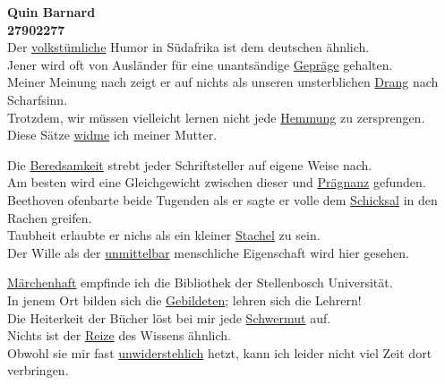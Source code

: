 \documentclass[12pt,a4paper]{article}
\begin{document}
\textbf{Quin Barnard}\\
\textbf{27902277}\\

Der \underline{volkstümliche} Humor in Südafrika ist dem deutschen ähnlich.\\
Jener wird oft von Ausländer für eine unantsändige \underline{Gepräge} gehalten.\\
Meiner Meinung nach zeigt er auf nichts als unseren unsterblichen \underline{Drang} nach Scharfsinn.\\
Trotzdem, wir müssen vielleicht lernen nicht jede \underline{Hemmung} zu zersprengen.\\
Diese Sätze \underline{widme} ich meiner Mutter.\par

Die \underline{Beredsamkeit} strebt jeder Schriftsteller auf eigene Weise nach.\\
Am besten wird eine Gleichgewicht zwischen dieser und \underline{Prägnanz} gefunden.\\
Beethoven ofenbarte beide Tugenden als er sagte er volle dem \underline{Schicksal} in den Rachen greifen.\\
Taubheit erlaubte er nichs als ein kleiner \underline{Stachel} zu sein.\\
Der Wille als der \underline{unmittelbar} menschliche Eigenschaft wird hier gesehen.\par

\underline{Märchenhaft} empfinde ich die Bibliothek der Stellenbosch Universität.\\
In jenem Ort bilden sich die \underline{Gebildeten}; lehren sich die Lehrern!\\
Die Heiterkeit der Bücher löst bei mir jede \underline{Schwermut} auf.\\
Nichts ist der \underline{Reize} des Wissens ähnlich.\\
Obwohl sie mir fast \underline{unwiderstehlich} hetzt, kann ich leider nicht viel Zeit dort verbringen.\par
\end{document}
